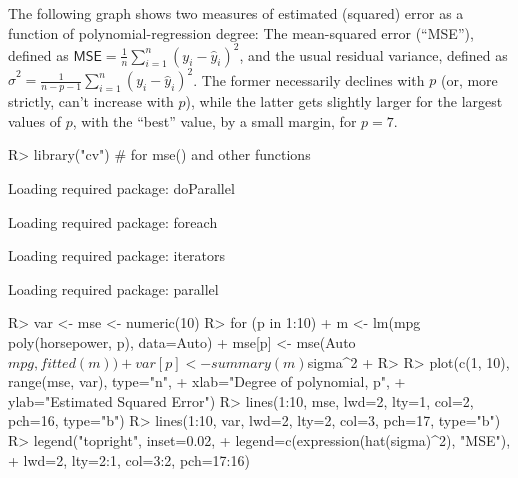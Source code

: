 \documentclass[
]{jss}
\begin{document}
The following graph shows two measures of estimated (squared) error as a
function of polynomial-regression degree: The mean-squared error
(``MSE''), defined as
\(\mathsf{MSE} = \frac{1}{n}\sum_{i=1}^n (y_i - \widehat{y}_i)^2\), and
the usual residual variance, defined as
\(\widehat{\sigma}^2 = \frac{1}{n - p - 1} \sum_{i=1}^n (y_i - \widehat{y}_i)^2\).
The former necessarily declines with \(p\) (or, more strictly, can't
increase with \(p\)), while the latter gets slightly larger for the
largest values of \(p\), with the ``best'' value, by a small margin, for
\(p = 7\).

\begin{CodeChunk}
\begin{CodeInput}
R> library("cv") # for mse() and other functions
\end{CodeInput}
\begin{CodeOutput}
Loading required package: doParallel
\end{CodeOutput}
\begin{CodeOutput}
Loading required package: foreach
\end{CodeOutput}
\begin{CodeOutput}
Loading required package: iterators
\end{CodeOutput}
\begin{CodeOutput}
Loading required package: parallel
\end{CodeOutput}
\begin{CodeInput}
R> var <- mse <- numeric(10)
R> for (p in 1:10){
+   m <- lm(mpg ~ poly(horsepower, p), data=Auto)
+   mse[p] <- mse(Auto$mpg, fitted(m))
+   var[p] <- summary(m)$sigma^2
+ }
R> 
R> plot(c(1, 10), range(mse, var), type="n",
+      xlab="Degree of polynomial, p",
+      ylab="Estimated Squared Error")
R> lines(1:10, mse, lwd=2, lty=1, col=2, pch=16, type="b")
R> lines(1:10, var, lwd=2, lty=2, col=3, pch=17, type="b")
R> legend("topright", inset=0.02,
+        legend=c(expression(hat(sigma)^2), "MSE"),
+        lwd=2, lty=2:1, col=3:2, pch=17:16)
\end{CodeInput}
\begin{figure}


\end{figure}
\end{CodeChunk}
\end{document}
